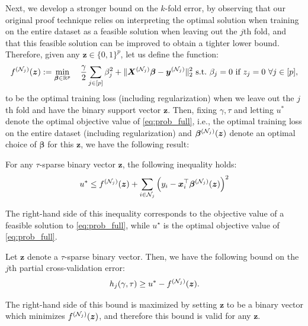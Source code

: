 \documentclass[ijoc,noblindrev]{informs3} %
\newcommand{\ag}[1]{{\color{black}#1}}
\begin{document}
Next, we develop a stronger bound on the $k$-fold error, by observing that our original proof technique relies on interpreting the optimal solution when training on the entire dataset as a feasible solution when leaving out the \ag{$j$}th fold, and that this feasible solution can be improved to obtain a tighter lower bound. Therefore, {given \ag{any} $\bm{z}\in \{0,1\}^p$,} let us define the function:{\color{black}
\begin{align*}
    f^{(\ag{\mathcal{N}_j})}(\bm{z}):=\min_{\bm{\beta} \in \mathbb{R}^p} \quad \frac{\gamma}{2}\sum_{j \in [p]}\beta_j^2+\Vert \bm{X}^{(\ag{\mathcal{N}_j})}\bm{\beta}-\bm{y}^{(\ag{\mathcal{N}_j})}\Vert_2^2 \ \text{s.t.} \ \beta_j=0 \ \text{if} \ z_j=0 \ \forall j \in [p],
\end{align*}}
to be the optimal training loss (including regularization) when we leave out the \ag{$j$th fold} and have the binary support vector $\bm{z}$. Then, fixing $\gamma, \tau$ and letting $u^*$ denote the optimal objective value of \eqref{eq:prob_full}, i.e., the optimal training loss on the entire dataset (including regularization) and $\bm{\beta}^{(\ag{\mathcal{N}_j})}(\bm{z})$ denote an optimal choice of $\bm{\beta}$ for this $\bm{z}$, we have the following result:
\begin{proposition}\label{prop2}
For any $\tau$-sparse binary vector $\bm{z}$, the following inequality holds:
\begin{align}
    u^*\leq f^{(\ag{\mathcal{N}_j})}(\bm{z})+\ag{\sum_{i\in \mathcal{N}_j}}\left(y_i-\bm{x}_i^\top \bm{\beta}^{(\ag{\mathcal{N}_j})}(\bm{z})\right)^2
\end{align}
\end{proposition}
The right-hand side of this inequality corresponds to the objective value of a feasible solution to \eqref{eq:prob_full}, while {\color{black}$u^\star$} is the optimal objective value of \eqref{eq:prob_full}. \Halmos
\endproof
\begin{corollary}\label{corr:lowerbound2}
Let $\bm{z}$ denote a $\tau$-sparse binary vector. Then, we have the following bound on the $j$th partial \ag{cross-validation} error:
\begin{align}\label{eq:LOOLower}
    h_j(\gamma, \tau) \geq u^*-f^{(\ag{\mathcal{N}_j})}(\bm{z}).
\end{align}
\end{corollary}
The right-hand side of this bound is maximized by setting $\bm{z}$ to be a binary vector which minimizes $f^{(\ag{\mathcal{N}_j})}(\bm{z})$, and therefore this bound is valid for any $\bm{z}$. \Halmos
\end{document}
